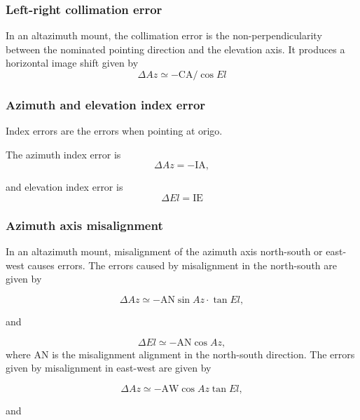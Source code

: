 \subsubsection{Left-right collimation error}
In an altazimuth mount, the collimation error is the non-perpendicularity between the nominated pointing direction and the elevation axis.
It produces a horizontal image shift given by
\begin{equation}\label{eq:pmodel_ca}
    \Delta Az \simeq -\text{CA} / \cos{El}
\end{equation}


\subsubsection{Azimuth and elevation index error}
Index errors are the errors when pointing at origo.

The azimuth index error is 
\begin{equation}
    \Delta Az = -\text{IA},
\end{equation}

and elevation index error is
\begin{equation}\label{eq:pmodel_ie}
    \Delta El = \text{IE}
\end{equation}

\subsubsection{Azimuth axis misalignment} 

In an altazimuth mount, misalignment of the azimuth axis north-south or east-west causes errors.
The errors caused by misalignment in the north-south are given by

\begin{equation}
    \Delta Az \simeq - \text{AN} \sin{Az} \cdot \tan{El},
\end{equation}

and

\begin{equation}
    \Delta El \simeq - \text{AN} \cos{Az},
\end{equation}
where AN is the misalignment alignment in the north-south direction.
The errors given by misalignment in east-west are given by

\begin{equation}
    \Delta Az \simeq - \text{AW} \cos{Az} \tan{El},
\end{equation}

and

